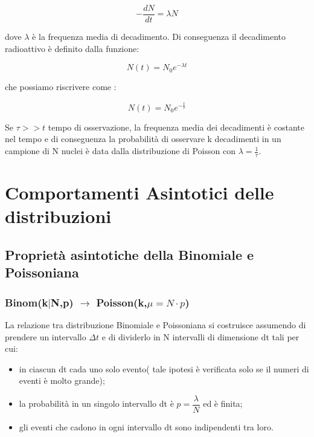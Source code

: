 \documentclass[11pt,a4paper]{book}
\begin{document}
\begin{equation}
	-\dfrac{dN}{dt} = \lambda N
\end{equation}

dove $\lambda$ \`{e} la frequenza media di decadimento. Di conseguenza il decadimento radioattivo \`{e} definito dalla funzione:

\begin{equation}
	N(t) = N_{0}e^{-\lambda t}
\end{equation}

che possiamo riscrivere come :

\begin{equation}
	N(t) = N_{0} e^{-\frac{t}{\tau}}
\end{equation}

Se $\tau >> t$ tempo di osservazione, la frequenza media dei decadimenti \`{e} costante nel tempo e di conseguenza la probabilit\`{a} di osservare k decadimenti in un campione di N nuclei \`{e} data dalla distribuzione di Poisson con $\lambda = \frac{1}{\tau}$.

\section{Comportamenti Asintotici delle distribuzioni}

\subsection{Propriet\`{a} asintotiche della Binomiale e Poissoniana}

\subsubsection{Binom(k$\vert$N,p) $\rightarrow$ Poisson(k,$\mu = N \cdot p$)}
La relazione tra distribuzione Binomiale e Poissoniana si costruisce assumendo di prendere un intervallo $\Delta t$ e di dividerlo in N intervalli di dimensione dt tali per cui:

\begin{itemize}
	\item in ciascun dt cada uno solo evento( tale ipotesi \`{e} verificata solo se il numeri di eventi \`{e} molto grande);
	\item la probabilit\`{a} in un singolo intervallo dt \`{e} $p = \dfrac{\lambda}{N}$ ed \`{e} finita;
	\item gli eventi che cadono in ogni intervallo dt sono indipendenti tra loro.
	
\end{itemize}
\end{document}
